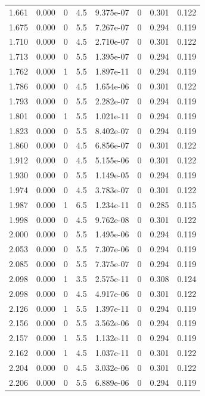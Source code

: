 \documentclass[preview]{standalone}
\begin{document}
{{{\begin{tabular}{L{1.2cm}C{1.2cm} C{0.3cm}C{0.5cm} C{1.4cm}C{1.4cm} C{1.4cm}C{1.4cm}}
  1.661  &  0.000  & 0     & 4.5 &  9.375e-07  & 0  & 0.301 &  0.122   \\ 
  1.675  &  0.000  & 0     & 5.5 &  7.267e-07  & 0  & 0.294 &  0.119   \\ 
  1.710  &  0.000  & 0     & 4.5 &  2.710e-07  & 0  & 0.301 &  0.122   \\ 
  1.713  &  0.000  & 0     & 5.5 &  1.395e-07  & 0  & 0.294 &  0.119   \\ 
  1.762  &  0.000  & 1     & 5.5 &  1.897e-11  & 0  & 0.294 &  0.119   \\ 
  1.786  &  0.000  & 0     & 4.5 &  1.654e-06  & 0  & 0.301 &  0.122   \\ 
  1.793  &  0.000  & 0     & 5.5 &  2.282e-07  & 0  & 0.294 &  0.119   \\ 
  1.801  &  0.000  & 1     & 5.5 &  1.021e-11  & 0  & 0.294 &  0.119   \\ 
  1.823  &  0.000  & 0     & 5.5 &  8.402e-07  & 0  & 0.294 &  0.119   \\ 
  1.860  &  0.000  & 0     & 4.5 &  6.856e-07  & 0  & 0.301 &  0.122   \\ 
  1.912  &  0.000  & 0     & 4.5 &  5.155e-06  & 0  & 0.301 &  0.122   \\ 
  1.930  &  0.000  & 0     & 5.5 &  1.149e-05  & 0  & 0.294 &  0.119   \\ 
  1.974  &  0.000  & 0     & 4.5 &  3.783e-07  & 0  & 0.301 &  0.122   \\ 
  1.987  &  0.000  & 1     & 6.5 &  1.234e-11  & 0  & 0.285 &  0.115   \\ 
  1.998  &  0.000  & 0     & 4.5 &  9.762e-08  & 0  & 0.301 &  0.122   \\ 
  2.000  &  0.000  & 0     & 5.5 &  1.495e-06  & 0  & 0.294 &  0.119   \\ 
  2.053  &  0.000  & 0     & 5.5 &  7.307e-06  & 0  & 0.294 &  0.119   \\ 
  2.085  &  0.000  & 0     & 5.5 &  7.375e-07  & 0  & 0.294 &  0.119   \\ 
  2.098  &  0.000  & 1     & 3.5 &  2.575e-11  & 0  & 0.308 &  0.124   \\ 
  2.098  &  0.000  & 0     & 4.5 &  4.917e-06  & 0  & 0.301 &  0.122   \\ 
  2.126  &  0.000  & 1     & 5.5 &  1.397e-11  & 0  & 0.294 &  0.119   \\ 
  2.156  &  0.000  & 0     & 5.5 &  3.562e-06  & 0  & 0.294 &  0.119   \\ 
  2.157  &  0.000  & 1     & 5.5 &  1.132e-11  & 0  & 0.294 &  0.119   \\ 
  2.162  &  0.000  & 1     & 4.5 &  1.037e-11  & 0  & 0.301 &  0.122   \\ 
  2.204  &  0.000  & 0     & 4.5 &  3.032e-06  & 0  & 0.301 &  0.122   \\ 
  2.206  &  0.000  & 0     & 5.5 &  6.889e-06  & 0  & 0.294 &  0.119   \\ 
\hline 
\end{tabular} 

}}}
\end{document}
